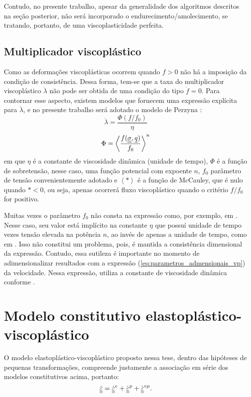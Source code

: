 Contudo, no presente trabalho, apesar da generalidade dos algoritmos descritos na seção posterior, não será incorporado o endurecimento/amolecimento, se tratando, portanto, de uma viscoplasticidade perfeita.

\subsection{Multiplicador viscoplástico}
Como as deformações viscoplásticas ocorrem quando $f>0$ não há a imposição da condição de consistência. Dessa forma, tem-se que a taxa do multiplicador viscoplástico $\dot \lambda$ não pode ser obtida de uma condição do tipo $\dot f = 0$. Para contornar esse aspecto, existem modelos que fornecem uma expressão explícita para $\dot \lambda$, e no presente trabalho será adotado o modelo de Perzyna \cite[p. 823]{Zienkiewicz1974}:
\begin{equation}
	\label{eq:lambdavp}
	\dot \lambda = \dfrac{\Phi(f/f_0)}{\eta}
\end{equation}
\begin{equation}
	\label{eq:sobretensao}
	\Phi = \left\langle  \dfrac{f(\underline{\underline \sigma},\underline q)}{f_0} \right\rangle^n
\end{equation}
em que $\eta$ é a constante de viscosidade dinâmica (unidade de tempo), $\Phi$ é a função de sobretensão, nesse caso, uma função potencial com expoente $n$, $f_0$ parâmetro de tensão convenientemente adotado e $\left\langle * \right\rangle$ é a função de McCauley, que é nulo quando $*<0$, ou seja, apenas ocorrerá fluxo viscoplástico quando o critério $f/f_0$ for positivo.  

Muitas vezes o parâmetro $f_0$ não consta na expressão como, por exemplo, em . Nesse caso, seu valor está implícito na constante $\eta$ que possuí unidade de tempo vezes tensão elevada na potência $n$, ao invés de apenas a unidade de tempo, como em . Isso não constitui um problema, pois, é mantida a consistência dimensional da expressão. Contudo, essa sutileza é importante no momento de adimensionalizar resultados com a expressão (\ref{eq:parametros_admensionais_vp}) da velocidade. Nessa expressão,  utiliza a constante de viscosidade dinâmica conforme .

\section{Modelo constitutivo elastoplástico-viscoplástico}
O modelo elastoplástico-viscoplástico proposto nessa tese, dentro das hipóteses de pequenas transformações, compreende justamente a associação em série dos modelos constitutivos acima, portanto:
\begin{equation}
	\label{eq:decomposicao_deformacoes_epvp}
	\dot {\underline{\underline \varepsilon}} = \dot {\underline{\underline \varepsilon}}^e + \dot {\underline{\underline \varepsilon}}^{p} + \dot {\underline{\underline \varepsilon}}^{vp}.
\end{equation}

